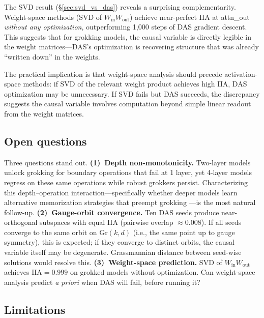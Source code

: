\documentclass{article}
\newcommand{\Gr}{\mathrm{Gr}}
\newcommand{\IIA}{\mathrm{IIA}}
\begin{document}
The SVD result (\S\ref{sec:svd_vs_das}) reveals a surprising complementarity.
Weight-space methods (SVD of $W_\text{in} W_\text{out}$) achieve near-perfect
IIA at attn\_out \emph{without any optimization}, outperforming 1{,}000 steps
of DAS gradient descent. This suggests that for grokking models, the causal
variable is directly legible in the weight matrices---DAS's optimization
is recovering structure that was already ``written down'' in the weights.

The practical implication is that weight-space analysis should precede
activation-space methods: if SVD of the relevant weight product achieves
high IIA, DAS optimization may be unnecessary. If SVD fails but DAS
succeeds, the discrepancy suggests the causal variable involves
computation beyond simple linear readout from the weight matrices.

\subsection{Open questions}

Three questions stand out.
\textbf{(1)~Depth non-monotonicity.}
Two-layer models unlock grokking for boundary operations that fail at 1 layer,
yet 4-layer models regress on these same operations while robust grokkers
persist. Characterizing this depth--operation interaction---specifically
whether deeper models learn alternative memorization strategies that
preempt grokking \citep{arpit2017closer}---is the most natural follow-up.
\textbf{(2)~Gauge-orbit convergence.}
Ten DAS seeds produce near-orthogonal subspaces with equal IIA (pairwise
overlap $\approx 0.008$). If all seeds converge to the same orbit on
$\Gr(k,d)$ (i.e., the same point up to gauge symmetry), this is expected;
if they converge to distinct orbits, the causal variable itself may be
degenerate. Grassmannian distance between seed-wise solutions would
resolve this.
\textbf{(3)~Weight-space prediction.}
SVD of $W_\text{in} W_\text{out}$ achieves $\IIA = 0.999$ on grokked
models without optimization. Can weight-space analysis predict \emph{a
priori} when DAS will fail, before running it?

\subsection{Limitations}
\label{sec:limitations}
\end{document}
